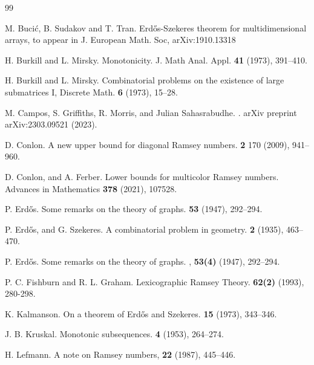 \documentclass[10pt]{article}
\begin{document}
\begin{thebibliography}{99}

M. Buci\'c, B. Sudakov and T. Tran. \newblock Erd\H os-Szekeres theorem for multidimensional arrays, {\newblock to appear in J. European Math. Soc}, { arXiv:1910.13318} %

H. Burkill and L. Mirsky. \newblock Monotonicity. {\newblock J. Math Anal. Appl.}  \textbf{41} (1973), 391--410.

 H. Burkill and L. Mirsky. \newblock Combinatorial problems on the existence of large submatrices I, {\newblock Discrete
Math.}  \textbf{6} (1973), 15--28.

M. Campos, S. Griffiths, R. Morris, and Julian Sahasrabudhe. . \newblock arXiv preprint arXiv:2303.09521 (2023).

D. Conlon. \newblock A new upper bound for diagonal Ramsey numbers.   \textbf{2} 170 (2009),
941--960.

D. Conlon, and A. Ferber. \newblock Lower bounds for multicolor Ramsey numbers. \newblock Advances in Mathematics \textbf{378} (2021), 107528.

P. Erd\H{o}s. \newblock Some remarks on the theory of graphs.  \textbf{53} (1947), 292--294.

P. Erd\H{o}s, and G. Szekeres. \newblock A combinatorial problem in geometry.  {\bf 2} (1935), 463--470.



P. Erd\H{o}s. \newblock Some remarks on the theory of graphs. , \textbf{53(4)} (1947), 292--294.

P. C. Fishburn and R. L. Graham. \newblock Lexicographic Ramsey Theory.  {\bf 62(2)}  (1993), 280-298.

K. Kalmanson. \newblock On a theorem of Erd\H{o}s and Szekeres.    \textbf{15} (1973), 343--346.

J. B. Kruskal. \newblock Monotonic subsequences.  \textbf{4} (1953), 264--274.

 H. Lefmann. \newblock A note on Ramsey numbers,  \textbf{22} (1987), 445--446.


\end{thebibliography}
\end{document}
